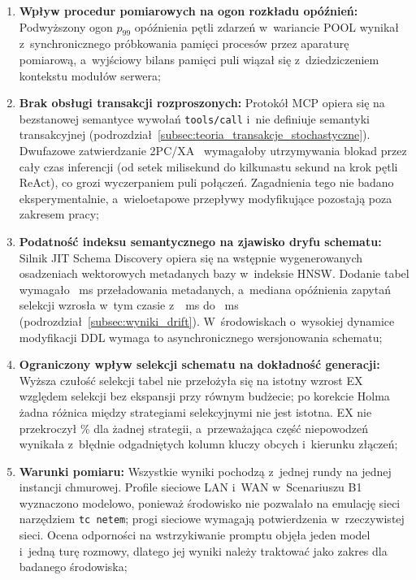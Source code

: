 \begin{enumerate}
    \item \textbf{Wpływ procedur pomiarowych na ogon rozkładu opóźnień:}
    Podwyższony ogon $p_{99}$ opóźnienia pętli zdarzeń w~wariancie POOL wynikał z~synchronicznego próbkowania pamięci procesów przez aparaturę pomiarową, a~wyjściowy bilans pamięci puli wiązał się z~dziedziczeniem kontekstu modułów serwera;

    \item \textbf{Brak obsługi transakcji rozproszonych:}
    Protokół MCP opiera się na bezstanowej semantyce wywołań \texttt{tools/call} i~nie definiuje semantyki transakcyjnej (podrozdział~\ref{subsec:teoria_transakcje_stochastyczne}). Dwufazowe zatwierdzanie 2PC/XA~\cite{gray1978notes} wymagałoby utrzymywania blokad przez cały czas inferencji (od setek milisekund do kilkunastu sekund na krok pętli ReAct), co grozi wyczerpaniem puli połączeń. Zagadnienia tego nie badano eksperymentalnie, a~wieloetapowe przepływy modyfikujące pozostają poza zakresem pracy;

    \item \textbf{Podatność indeksu semantycznego na zjawisko dryfu schematu:}
    Silnik JIT Schema Discovery opiera się na wstępnie wygenerowanych osadzeniach wektorowych metadanych bazy w~indeksie HNSW. Dodanie \wynDriftTables{} tabel wymagało \wynDriftTotal~ms przeładowania metadanych, a~mediana opóźnienia zapytań selekcji wzrosła w~tym czasie z~\wynDriftBase~ms do \wynDriftInflight~ms (podrozdział~\ref{subsec:wyniki_drift}). W~środowiskach o~wysokiej dynamice modyfikacji DDL wymaga to asynchronicznego wersjonowania schematu;

    \item \textbf{Ograniczony wpływ selekcji schematu na dokładność generacji:}
    Wyższa czułość selekcji tabel nie przełożyła się na istotny wzrost EX względem selekcji bez ekspansji przy równym budżecie; po korekcie Holma żadna różnica między strategiami selekcyjnymi nie jest istotna. EX nie przekroczył \wynExLargeBmEight\% dla żadnej strategii, a~przeważająca część niepowodzeń wynikała z~błędnie odgadniętych kolumn kluczy obcych i~kierunku złączeń;

    \item \textbf{Warunki pomiaru:}
    Wszystkie wyniki pochodzą z~jednej rundy na jednej instancji chmurowej. Profile sieciowe LAN i~WAN w~Scenariuszu B1 wyznaczono modelowo, ponieważ środowisko nie pozwalało na emulację sieci narzędziem \texttt{tc netem}; progi sieciowe wymagają potwierdzenia w~rzeczywistej sieci. Ocena odporności na wstrzykiwanie promptu objęła jeden model i~jedną turę rozmowy, dlatego jej wyniki należy traktować jako zakres dla badanego środowiska;


\end{enumerate}

